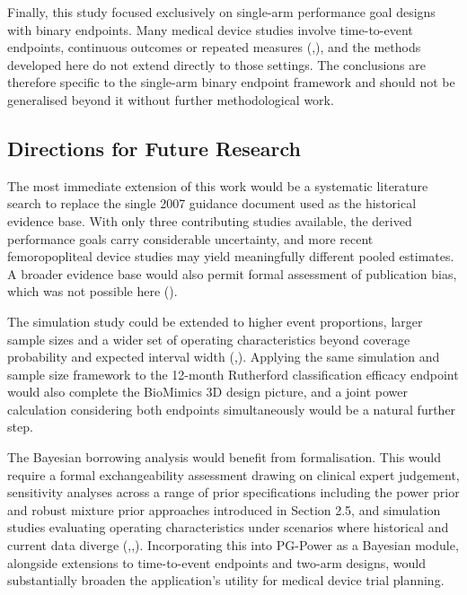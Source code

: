 \documentclass{article}
\begin{document}
Finally, this study focused exclusively on single-arm performance goal
designs with binary endpoints. Many medical device studies involve
time-to-event endpoints, continuous outcomes or repeated measures
(,),
and the methods developed here do not extend directly to those settings.
The conclusions are therefore specific to the single-arm binary endpoint
framework and should not be generalised beyond it without further
methodological work.

\subsection{Directions for Future
Research}\label{directions-for-future-research}

The most immediate extension of this work would be a systematic
literature search to replace the single 2007 guidance document used as
the historical evidence base. With only three contributing studies
available, the derived performance goals carry considerable uncertainty,
and more recent femoropopliteal device studies may yield meaningfully
different pooled estimates. A broader evidence base would also permit
formal assessment of publication bias, which was not possible here
().

The simulation study could be extended to higher event proportions,
larger sample sizes and a wider set of operating characteristics beyond
coverage probability and expected interval width
(,).
Applying the same simulation and sample size framework to the 12-month
Rutherford classification efficacy endpoint would also complete the
BioMimics 3D design picture, and a joint power calculation considering
both endpoints simultaneously would be a natural further step.

The Bayesian borrowing analysis would benefit from formalisation. This
would require a formal exchangeability assessment drawing on clinical
expert judgement, sensitivity analyses across a range of prior
specifications including the power prior and robust mixture prior
approaches introduced in Section 2.5, and simulation studies evaluating
operating characteristics under scenarios where historical and current
data diverge
(,,).
Incorporating this into PG-Power as a Bayesian module, alongside
extensions to time-to-event endpoints and two-arm designs, would
substantially broaden the application's utility for medical device trial
planning.
\end{document}

